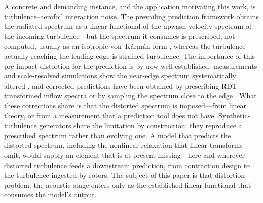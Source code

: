 \documentclass[11pt,a4paper]{article}
\begin{document}
A concrete and demanding instance, and the application motivating this
work, is turbulence--aerofoil interaction noise. The prevailing
prediction framework \citep{Amiet1975,PatersonAmiet1977,RogerMoreau2010}
obtains the radiated spectrum as a linear functional of the upwash
velocity spectrum of the incoming turbulence---but the spectrum it
consumes is prescribed, not computed, usually as an isotropic
von~K\'arm\'an form \citep{vonKarman1948}, whereas the turbulence
actually reaching the leading edge is strained turbulence. The
importance of this pre-impact distortion for the prediction is by now
well established: measurements and scale-resolved simulations show the
near-edge spectrum systematically altered
\citep{dosSantos2023,Ribeiro2023,Piccolo2024}, and corrected predictions
have been obtained by prescribing RDT-transformed inflow spectra
\citep{deSantana2016,dosSantos2023} or by sampling the spectrum close to
the edge \citep{Piccolo2024}. What these corrections share is that the
distorted spectrum is imposed---from linear theory, or from a
measurement that a prediction tool does not have. Synthetic-turbulence
generators \citep{KimHaeri2015} share the limitation by construction:
they reproduce a prescribed spectrum rather than evolving one. A model that predicts the distorted spectrum, including the nonlinear
relaxation that linear transforms omit, would supply an element that is
at present missing---here and wherever distorted turbulence feeds a
downstream prediction, from contraction design to the turbulence ingested
by rotors. The subject
of this paper is that distortion problem; the acoustic stage enters
only as the established linear functional that consumes the model's
output.
\end{document}
